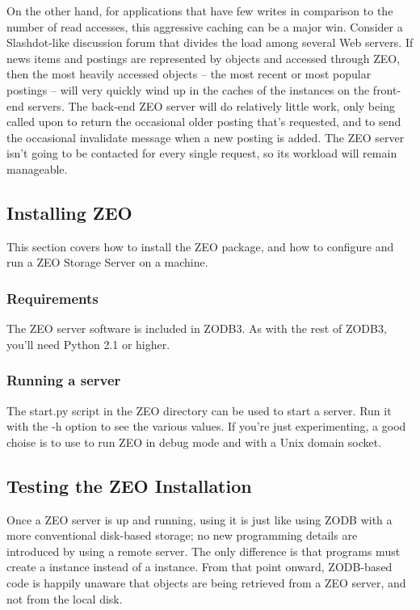 On the other hand, for applications that have few writes in comparison
to the number of read accesses, this aggressive caching can be a major
win.  Consider a Slashdot-like discussion forum that divides the load
among several Web servers.  If news items and postings are represented
by objects and accessed through ZEO, then the most heavily accessed
objects -- the most recent or most popular postings -- will very
quickly wind up in the caches of the
 instances on the front-end servers.  The
back-end ZEO server will do relatively little work, only being called
upon to return the occasional older posting that's requested, and to
send the occasional invalidate message when a new posting is added.
The ZEO server isn't going to be contacted for every single request,
so its workload will remain manageable.

\subsection{Installing ZEO}

This section covers how to install the ZEO package, and how to 
configure and run a ZEO Storage Server on a machine. 

\subsubsection{Requirements}

The ZEO server software is included in ZODB3.  As with the rest of
ZODB3, you'll need Python 2.1 or higher.

\subsubsection{Running a server}

The start.py script in the ZEO directory can be used to start a
server.  Run it with the -h option to see the various values.  If
you're just experimenting, a good choise is to use 
 to run ZEO in
debug mode and with a Unix domain socket.

\subsection{Testing the ZEO Installation}

Once a ZEO server is up and running, using it is just like using ZODB
with a more conventional disk-based storage; no new programming
details are introduced by using a remote server.  The only difference
is that programs must create a  instance instead
of a  instance.  From that point onward, ZODB-based
code is happily unaware that objects are being retrieved from a ZEO
server, and not from the local disk.

